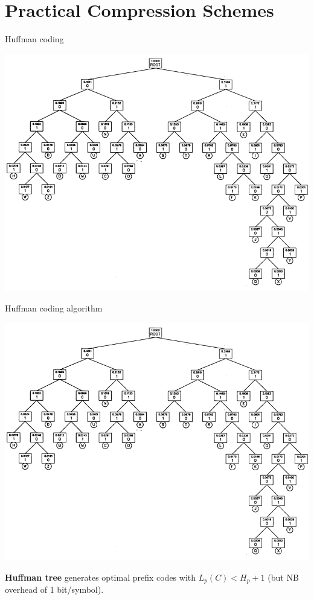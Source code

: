 \documentclass{beamer}
\begin{document}
\section{Practical Compression Schemes}

\begin{frame}{Huffman coding}

 \centerline{ \includegraphics[height=.8\textheight]{huffman.png} }

\end{frame}

\begin{frame}{Huffman coding algorithm}

 \centerline{ \includegraphics[height=.5\textheight]{huffman.png} }

\itemb
\item {\bf Huffman tree} generates optimal prefix codes with $L_p(C) < H_p + 1$ (but NB overhead of 1 bit/symbol).
\iteme

\end{frame}
\end{document}
